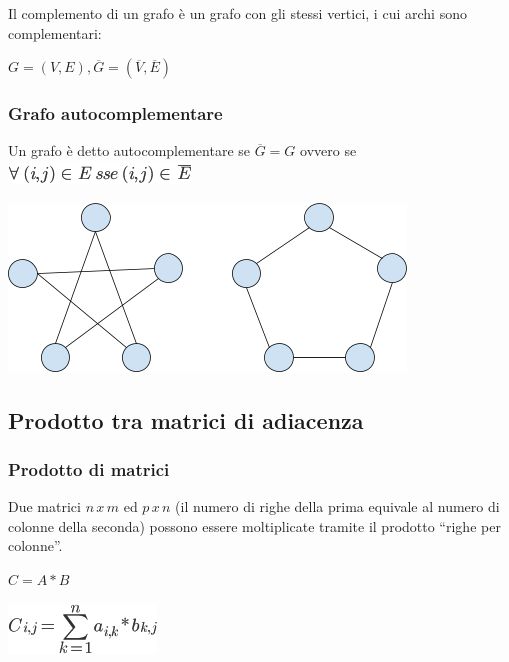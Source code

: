 \documentclass{article}
\begin{document}
{{{{Il complemento di un grafo è un grafo con gli stessi vertici, i cui
archi sono complementari:}

$G=(V,E), \overline{G}=(\overline{V},\overline{E})$

{}

\hypertarget{h.tsrwv4qy0dku}{\subsubsection{\texorpdfstring{{Grafo
autocomplementare}}{Grafo autocomplementare}}\label{h.tsrwv4qy0dku}}

{Un grafo è detto autocomplementare se $\overline{G}=G$ ovvero se
}\includegraphics{images/image405.png}

{\includegraphics{images/image532.png}}

{}

\hypertarget{h.akx1r9fzvwzo}{\subsection{\texorpdfstring{{Prodotto tra
matrici di
adiacenza}}{Prodotto tra matrici di adiacenza}}\label{h.akx1r9fzvwzo}}

{}

\hypertarget{h.c39ti8il3qtf}{\subsubsection{\texorpdfstring{{Prodotto di
matrici}}{Prodotto di matrici}}\label{h.c39ti8il3qtf}}

{Due matrici $n\,x\,m$ ed $p\,x\,n$ (il numero di righe della prima equivale al numero di colonne della seconda) possono essere moltiplicate tramite il prodotto ``righe per colonne''.}

$C = A*B$

\includegraphics{images/image407.png}

}}}
\end{document}
